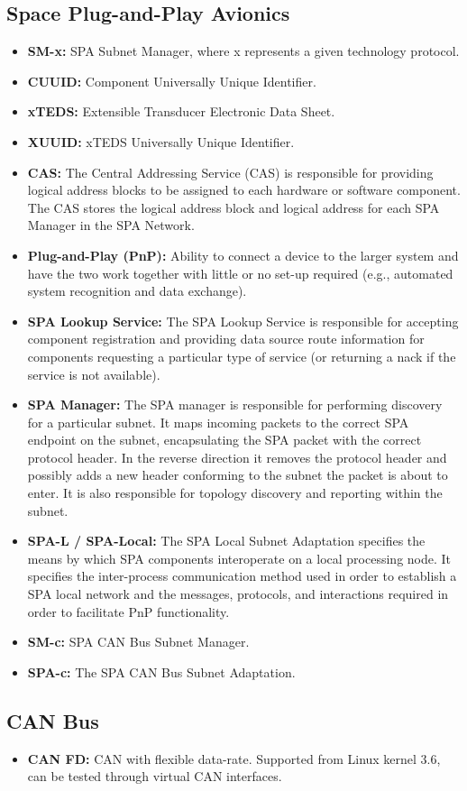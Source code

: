 \subsection{Space Plug-and-Play Avionics}
\begin{itemize}
    \item \textbf{SM-x:} SPA Subnet Manager, where x represents a given
        technology protocol.
    \item \textbf{CUUID:} Component Universally Unique Identifier.
    \item \textbf{xTEDS:} Extensible Transducer Electronic Data Sheet.
    \item \textbf{XUUID:} xTEDS Universally Unique Identifier.
    \item \textbf{CAS:} The Central Addressing Service (CAS) is
responsible for providing logical address blocks to be assigned to each
hardware or software component. The CAS stores the logical address block
and logical address for each SPA Manager in the SPA Network.
    \item \textbf{Plug-and-Play (PnP):} Ability to connect a device to the larger system and
have the two work together with little or no set-up required (e.g., automated
system recognition and data exchange).
    \item \textbf{SPA Lookup Service:} The SPA Lookup Service is responsible for accepting
component registration and providing data source route information for
components requesting a particular type of service (or returning a nack if
the service is not available).
    \item \textbf{SPA Manager:} The SPA manager is responsible for performing discovery for a
particular subnet. It maps incoming packets to the correct SPA endpoint on the
subnet, encapsulating the SPA packet with the correct protocol header. In the
reverse direction it removes the protocol header and possibly adds a new header
conforming to the subnet the packet is about to enter. It is also responsible
for topology discovery and reporting within the subnet.
    \item \textbf{SPA-L / SPA-Local:} The SPA Local Subnet Adaptation specifies the means
by which SPA components interoperate on a local processing node. It specifies
the inter-process communication method used in order to establish a SPA local
network and the messages, protocols, and interactions required in order to
facilitate PnP functionality.
    \item \textbf{SM-c:} SPA CAN Bus Subnet Manager.
    \item \textbf{SPA-c:} The SPA CAN Bus Subnet Adaptation.
\end{itemize}

\subsection{CAN Bus}
\begin{itemize}
    \item \textbf{CAN FD:} CAN with flexible data-rate. Supported from Linux kernel 3.6, can
be tested through virtual CAN interfaces.
\end{itemize}

